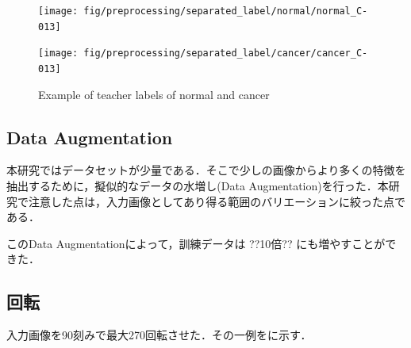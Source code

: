 \begin{figure}[H]
	\centering
	
	\begin{minipage}{0.4\columnwidth}
		\centering
		\texttt{[image: fig/preprocessing/separated\_label/normal/normal\_C-013]}
	\end{minipage}
	\begin{minipage}{0.4\columnwidth}
		\centering
		\texttt{[image: fig/preprocessing/separated\_label/cancer/cancer\_C-013]}
	\end{minipage}
	
	\caption{Example of teacher labels of normal and cancer}
	\label{fig:検体A教師ラベル}
	
\end{figure}


\subsection{Data Augmentation}
本研究ではデータセットが少量である．そこで少しの画像からより多くの特徴を抽出するために，擬似的なデータの水増し(Data Augmentation)を行った．本研究で注意した点は，入力画像としてあり得る範囲のバリエーションに絞った点である．

このData Augmentationによって，訓練データは
??10倍??
にも増やすことができた．

\subsection*{回転}
入力画像を90\deg 刻みで最大270\deg 回転させた．その一例をに示す．

